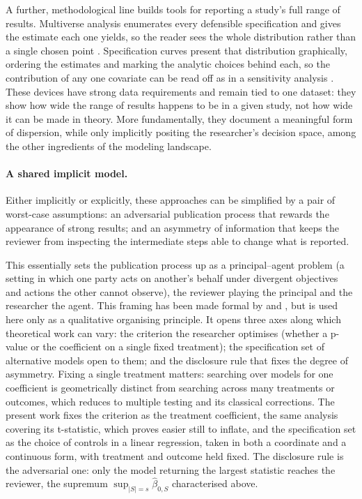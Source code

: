 A further, methodological line builds tools
for reporting a study's full range of results.
Multiverse analysis enumerates every 
defensible specification and gives the estimate each one yields, so the reader
sees the whole distribution rather than a single chosen point
\citep{steegenIncreasingTransparencyMultiverse2016}. Specification curves
present that distribution graphically, ordering the estimates and marking the
analytic choices behind each, so the contribution of any one covariate can be
read off as in a sensitivity analysis
\citep{simonsohnSpecificationCurveDescriptive2019}. These devices have strong
data requirements and remain tied to one dataset: they show how wide the range
of results happens to be in a given study, not how wide it can be made in
theory. 
More fundamentally, they document a meaningful form of dispersion,
while only implicitly positing the researcher's decision space, among the other 
ingredients of the modeling landscape.

\paragraph{A shared implicit model.} Either implicitly or explicitly, these approaches can be simplified by a pair of worst-case assumptions: an adversarial
publication process that rewards the appearance of strong results; and an
asymmetry of information that keeps the reviewer from inspecting the intermediate
steps able to change what is reported. 

This essentially sets the publication process up as 
a principal--agent problem \citep{ross1973economic,holmstrom1979moral,laffontMartimort2002theory} (a setting in which one party acts on another's behalf under divergent objectives and actions the other cannot observe),
the reviewer playing the principal and the researcher
the agent. This framing has been made formal by \citet{spiess2018optimal} and
\citet{kasy2022optimal}, but is used here only as a qualitative organising
principle. It opens three axes along which theoretical work can vary: the
criterion the researcher optimises (whether a p-value or the coefficient on a
single fixed treatment); the specification set of alternative models open to
them; and the disclosure rule that fixes the degree of asymmetry. Fixing a
single treatment matters: searching over models for one coefficient is
geometrically distinct from searching across many treatments or outcomes, which
reduces to multiple testing and its classical corrections. The present work
fixes the criterion as the treatment coefficient, the same analysis covering its
t-statistic, which proves easier still to inflate, and the specification set as
the choice of controls in a linear regression, taken in both a coordinate and a
continuous form, with treatment and outcome held fixed. The disclosure rule is
the adversarial one: only the model returning the largest statistic reaches the
reviewer, the supremum $\sup_{|S|=s}\hat\beta_{0,S}$ characterised above.

